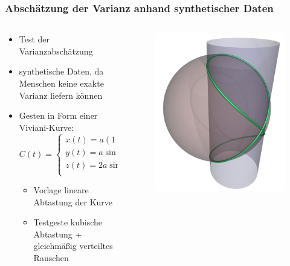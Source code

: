 \documentclass{beamer}
\begin{document}
\begin{frame}\frametitle{Abschätzung der Varianz anhand synthetischer Daten}
\begin{columns}
\begin{column}{.6\textwidth}
\begin{itemize}
\item Test der Varianzabschätzung
\item synthetische Daten, da Menschen keine exakte Varianz liefern können
\item Gesten in Form einer Viviani-Kurve:
\begin{equation}
C(t)=\left\{\begin{array}{l}
x(t)=a(1+\cos(t))\\
y(t)=a\sin(t)\\
z(t)=2a\sin(t/2)\\
\end{array}\right.
\end{equation} 
\begin{itemize}
\item Vorlage lineare Abtastung der Kurve
\item Testgeste kubische Abtastung + gleichmäßig verteiltes Rauschen
\end{itemize}
\end{itemize}
\end{column}
\begin{column}{.4\textwidth}
\begin{figure}
\centering
\includegraphics[width=\linewidth]{../Bilder/Viviani_curve}
\label{fig:Viviani_curve}
\end{figure}
\end{column}
\end{columns}
\end{frame}
\end{document}
